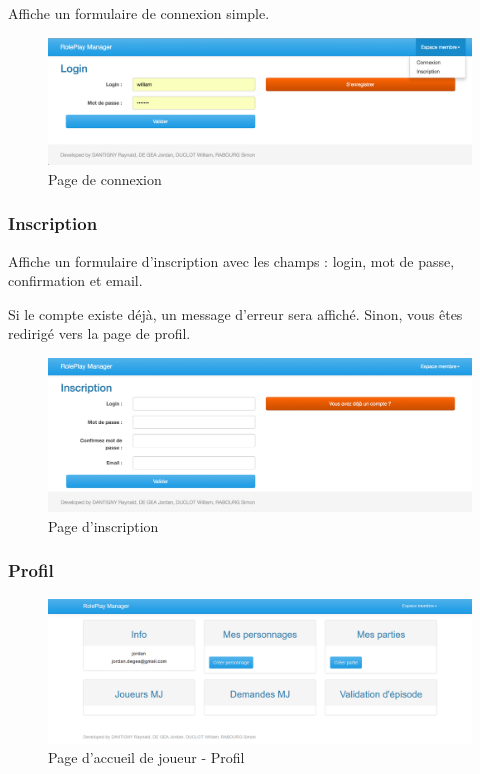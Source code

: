 \documentclass[a4paper,oneside,10pt]{article}
\begin{document}
Affiche un formulaire de connexion simple. 
\begin{figure}[H]
	\begin{center}
		\includegraphics[width=\textwidth]{images/manuel/login.png}  
		\caption{Page de connexion}
	\end{center}
\end{figure}


\subsubsection{Inscription}
\label{MUInscription}

Affiche un formulaire d'inscription avec les champs : login, mot de passe, confirmation et email. 

Si le compte existe déjà, un message d'erreur sera affiché. Sinon, vous êtes redirigé vers la page de profil. 
\begin{figure}[H]
	\begin{center}
		\includegraphics[width=\textwidth]{images/manuel/register.png}  
		\caption{Page d'inscription}
	\end{center}
\end{figure}

\subsubsection{Profil}
\label{MUProfil}

\begin{figure}[H]
	\begin{center}
		\includegraphics[width=\textwidth]{images/manuel/profil.png}  
		\caption{Page d'accueil de joueur - Profil}
	\end{center}
\end{figure}
\end{document}
